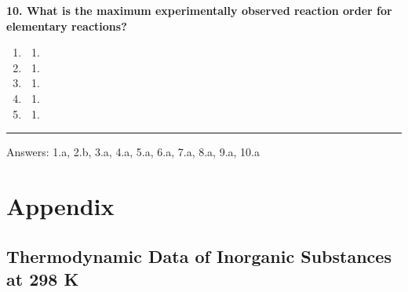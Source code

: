 \documentclass[
  9pt,
]{extbook}
\providecommand{\tightlist}{%
  \setlength{\itemsep}{0pt}\setlength{\parskip}{0pt}}
\theoremstyle{definition}
\theoremstyle{definition}
\theoremstyle{definition}
\theoremstyle{definition}
\theoremstyle{remark}
\begin{document}
\textbf{10. What is the maximum experimentally observed reaction order for elementary reactions?}

\begin{enumerate}
\def\labelenumi{\alph{enumi}.}
\tightlist
\item
  \begin{enumerate}
  \def\labelenumii{\arabic{enumii}.}
  \setcounter{enumii}{2}
  \tightlist
  \item
  \end{enumerate}
\item
  \begin{enumerate}
  \def\labelenumii{\arabic{enumii}.}
  \setcounter{enumii}{1}
  \tightlist
  \item
  \end{enumerate}
\item
  \begin{enumerate}
  \def\labelenumii{\arabic{enumii}.}
  \setcounter{enumii}{3}
  \tightlist
  \item
  \end{enumerate}
\item
  \begin{enumerate}
  \def\labelenumii{\arabic{enumii}.}
  \setcounter{enumii}{4}
  \tightlist
  \item
  \end{enumerate}
\item
  \begin{enumerate}
  \def\labelenumii{\arabic{enumii}.}
  \tightlist
  \item
  \end{enumerate}
\end{enumerate}

\begin{center}\rule{0.5\linewidth}{0.5pt}\end{center}

Answers: 1.a, 2.b, 3.a, 4.a, 5.a, 6.a, 7.a, 8.a, 9.a, 10.a

\renewcommand*{\standardstate}{{-\kern-6pt{\ominus}\kern-6pt-}}

\chapter{Appendix}\label{appendix}

\section{Thermodynamic Data of Inorganic Substances at 298 K}\label{thermodynamic-data-of-inorganic-substances-at-298-k}
\end{document}

